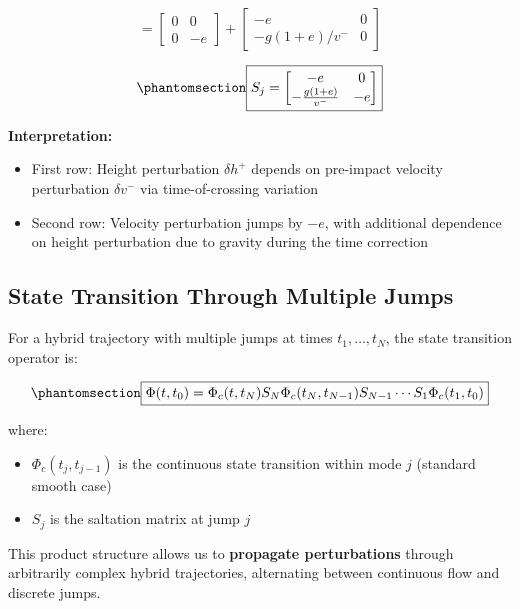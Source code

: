 \documentclass[
  letterpaper,
  DIV=11,
  numbers=noendperiod]{scrartcl}
\providecommand{\tightlist}{%
  \setlength{\itemsep}{0pt}\setlength{\parskip}{0pt}}\usepackage{longtable,booktabs,array}
\begin{document}
\[
= \begin{bmatrix} 0 & 0 \\ 0 & -e \end{bmatrix} + \begin{bmatrix} -e & 0 \\ -g(1+e)/v^- & 0 \end{bmatrix}
\]

\begin{equation}\phantomsection\label{eq-ball-saltation}{
\boxed{S_j = \begin{bmatrix} -e & 0 \\ -\frac{g(1+e)}{v^-} & -e \end{bmatrix}}
}\end{equation}

\textbf{Interpretation:}

\begin{itemize}
\tightlist
\item
  First row: Height perturbation \(\delta h^+\) depends on pre-impact
  velocity perturbation \(\delta v^-\) via time-of-crossing variation
\item
  Second row: Velocity perturbation jumps by \(-e\), with additional
  dependence on height perturbation due to gravity during the time
  correction
\end{itemize}

\subsection{State Transition Through Multiple
Jumps}\label{state-transition-through-multiple-jumps}

For a hybrid trajectory with multiple jumps at times
\(t_1, \ldots, t_N\), the state transition operator is:

\begin{equation}\phantomsection\label{eq-hybrid-stm}{
\boxed{\Phi(t, t_0) = \Phi_c(t, t_N) S_N \Phi_c(t_N, t_{N-1}) S_{N-1} \cdots S_1 \Phi_c(t_1, t_0)}
}\end{equation}

where:

\begin{itemize}
\tightlist
\item
  \(\Phi_c(t_j, t_{j-1})\) is the continuous state transition within
  mode \(j\) (standard smooth case)
\item
  \(S_j\) is the saltation matrix at jump \(j\)
\end{itemize}

This product structure allows us to \textbf{propagate perturbations}
through arbitrarily complex hybrid trajectories, alternating between
continuous flow and discrete jumps.
\end{document}
